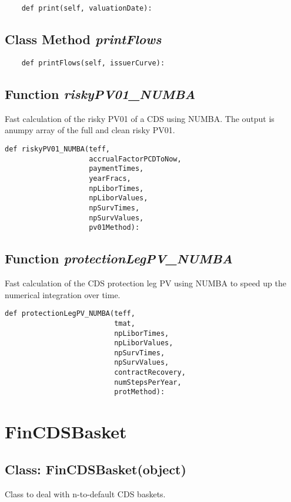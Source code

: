 \documentclass[twoside,11pt]{book}
\begin{document}
\begin{lstlisting}
    def print(self, valuationDate):
\end{lstlisting}

\subsection{Class Method {\it printFlows}}


\begin{lstlisting}
    def printFlows(self, issuerCurve):
\end{lstlisting}

\subsection{Function {\it riskyPV01\_NUMBA}}
Fast calculation of the risky PV01 of a CDS using NUMBA. The output is anumpy array of the full and clean risky PV01.

\begin{lstlisting}
def riskyPV01_NUMBA(teff, 
                    accrualFactorPCDToNow,
                    paymentTimes,
                    yearFracs,
                    npLiborTimes,
                    npLiborValues,
                    npSurvTimes,
                    npSurvValues,
                    pv01Method):
\end{lstlisting}

\subsection{Function {\it protectionLegPV\_NUMBA}}
Fast calculation of the CDS protection leg PV using NUMBA to speed up the numerical integration over time. 

\begin{lstlisting}
def protectionLegPV_NUMBA(teff,
                          tmat,
                          npLiborTimes,
                          npLiborValues,
                          npSurvTimes,
                          npSurvValues,
                          contractRecovery,
                          numStepsPerYear,
                          protMethod):
\end{lstlisting}

\newpage
\section{FinCDSBasket}

\subsection{Class: FinCDSBasket(object)}
Class to deal with n-to-default CDS baskets. 
\end{document}
